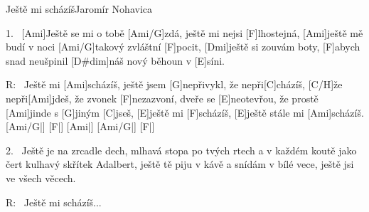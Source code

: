 \begin{song}{Ještě mi scházíš}{Jaromír Nohavica}

\begin{xverse}{1.~}
[Ami]Ještě se mi o tobě [Ami/G]zdá, ještě mi nejsi [F]lhostejná,
[Ami]ještě mě budí v noci [Ami/G]takový zvláštní [F]pocit,
[Dmi]ještě si zouvám boty, [F]abych snad neušpinil
[D#dim]náš nový běhoun v [E]síni.
\end{xverse}

\begin{xverse}{R:~}
Ještě mi [Ami]scházíš, ještě jsem [G]nepřivykl,
že nepři[C]cházíš, [C/H]{že} nepři[Ami]jdeš,
že zvonek [F]nezazvoní, dveře se [E]neotevřou,
že prostě [Ami]jinde s [G]jiným [C]jseš,
[E]ještě mi [F]scházíš, [E]ještě stále mi [Ami]scházíš.  [Ami/G|]{} [F|]{} [Ami|]{} [Ami/G|]{} [F|]{}
\end{xverse}

\begin{xverse}{2.~}
Ještě je na zrcadle dech, mlhavá stopa po tvých rtech
a v každém koutě jako čert kulhavý skřítek Adalbert,
ještě tě piju v kávě a snídám v bílé vece,
ještě jsi ve všech věcech.
\end{xverse}

\begin{xverse}{R:~}
Ještě mi scházíš...
\end{xverse}

\end{song}





